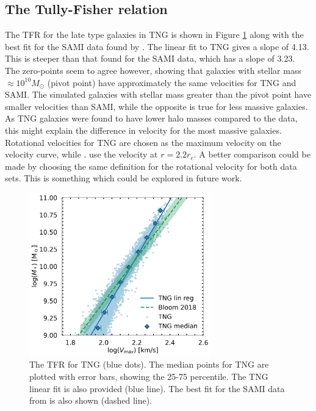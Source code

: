 \subsection{The Tully-Fisher relation}

The TFR for the late type galaxies in TNG is shown in Figure \ref{tfr_res} along with the best fit for the SAMI data found by \textcite{Bloom2017}. The linear fit to TNG gives a slope of 4.13. This is steeper than that found for the SAMI data, which has a slope of 3.23. The zero-points seem to agree however, showing that galaxies with stellar mass $ \approx 10^{10} M_{\odot}$ (pivot point) have approximately the same velocities for TNG and SAMI. The simulated galaxies with stellar mass greater than the pivot point have smaller velocities than SAMI, while the opposite is true for less massive galaxies. As TNG galaxies were found to have lower halo masses compared to the data, this might explain the difference in velocity for the most massive galaxies. Rotational velocities for TNG are chosen as the maximum velocity on the velocity curve, while \textcite{Bloom2017}. use the velocity at $r = 2.2 r_e$. A better comparison could be made by choosing the same definition for the rotational velocity for both data sets. This is something which could be explored in future work.

\begin{figure}
    \centering
    \includegraphics[width=0.7\textwidth]{images/results_tully_fisher.png}
    \caption{The TFR for TNG (blue dots). The median points for TNG are plotted with error bars, showing the 25-75 percentile. The TNG linear fit is also provided (blue line). The best fit for the SAMI data from \textcite{Bloom2017} is also shown (dashed line).}
    \label{tfr_res}
\end{figure}

